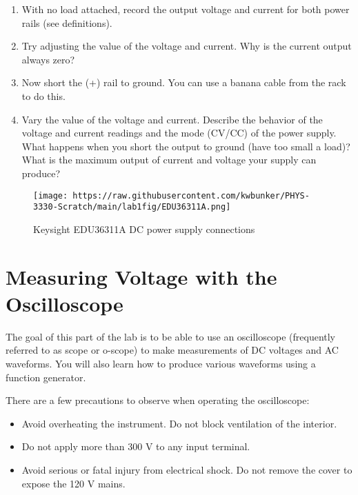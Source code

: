 \documentclass[
]{article}
\begin{document}
\begin{enumerate}
\def\labelenumi{\arabic{enumi}.}
\item
  With no load attached, record the output voltage and current for both
  power rails (see definitions).
\item
  Try adjusting the value of the voltage and current. Why is the current
  output always zero?
\item
  Now short the (+) rail to ground. You can use a banana cable from the
  rack to do this.
\item
  Vary the value of the voltage and current. Describe the behavior of
  the voltage and current readings and the mode (CV/CC) of the power
  supply. What happens when you short the output to ground (have too
  small a load)? What is the maximum output of current and voltage your
  supply can produce?
\end{enumerate}

\begin{figure}
\hypertarget{fig:ps}{%
\centering
\texttt{[image: https://raw.githubusercontent.com/kwbunker/PHYS-3330-Scratch/main/lab1fig/EDU36311A.png]}
\caption{Keysight EDU36311A DC power supply connections}\label{fig:ps}
}
\end{figure}

\hypertarget{measuring-voltage-with-the-oscilloscope}{%
\section{Measuring Voltage with the
Oscilloscope}\label{measuring-voltage-with-the-oscilloscope}}

The goal of this part of the lab is to be able to use an oscilloscope
(frequently referred to as scope or o-scope) to make measurements of DC
voltages and AC waveforms. You will also learn how to produce various
waveforms using a function generator.

There are a few precautions to observe when operating the oscilloscope:

\begin{itemize}
\item
  Avoid overheating the instrument. Do not block ventilation of the
  interior.
\item
  Do not apply more than 300 V to any input terminal.
\item
  Avoid serious or fatal injury from electrical shock. Do not remove the
  cover to expose the 120 V mains.
\end{itemize}
\end{document}
